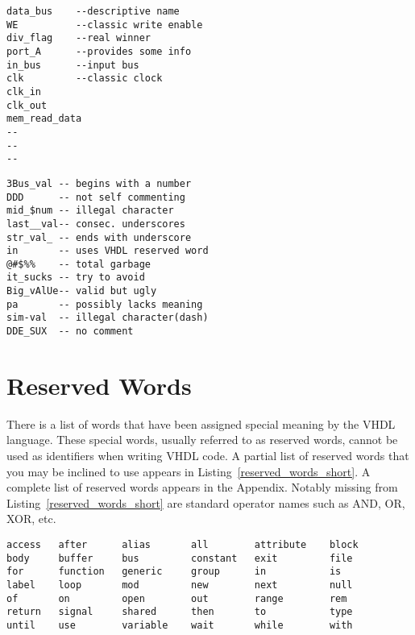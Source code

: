 \noindent
\begin{minipage}[lt]{0.49\linewidth}
\vspace{5pt}
\begin{lstlisting}[label=valid_identif, caption=Valid identifiers.]
data_bus	--descriptive name
WE			--classic write enable
div_flag	--real winner
port_A		--provides some info
in_bus		--input bus
clk			--classic clock
clk_in
clk_out
mem_read_data
--
--
--
\end{lstlisting}
\end{minipage}
\begin{minipage}[tr]{0.49\linewidth}
\vspace{5pt}
\begin{flushright}
\begin{lstlisting}[label=invalid_identif, caption=Invalid identifiers.]
3Bus_val -- begins with a number
DDD      -- not self commenting
mid_$num -- illegal character
last__val-- consec. underscores
str_val_ -- ends with underscore
in       -- uses VHDL reserved word
@#$%%    -- total garbage
it_sucks -- try to avoid
Big_vAlUe-- valid but ugly
pa       -- possibly lacks meaning
sim-val  -- illegal character(dash)
DDE_SUX  -- no comment
\end{lstlisting}
\end{flushright}
\end{minipage}

\section{Reserved Words}
There is a list of words that have been assigned special meaning by the VHDL language. These special words, usually referred to as reserved words, cannot be used as identifiers when writing VHDL code. A partial list of reserved words that you may be inclined to use appears in Listing~\ref{reserved_words_short}. A complete list of reserved words appears in the Appendix. Notably missing from Listing~\ref{reserved_words_short} are standard operator names such as AND, OR, XOR, etc.

\noindent
\begin{minipage}{0.99\linewidth}
\begin{lstlisting}[label=reserved_words_short, caption=A short list of VHDL reserved words.]
access   after      alias       all        attribute    block
body     buffer     bus         constant   exit         file
for      function   generic     group      in           is
label    loop       mod         new        next         null
of       on         open        out        range        rem
return   signal     shared      then       to           type
until    use        variable    wait       while        with
\end{lstlisting}
\end{minipage}

